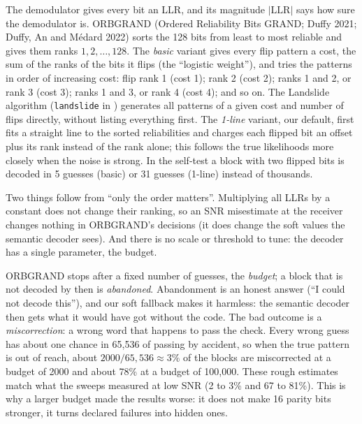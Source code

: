\documentclass{article}
\begin{document}
The demodulator gives every bit an LLR, and its magnitude $|\mathrm{LLR}|$ says how sure the demodulator
is. ORBGRAND (Ordered Reliability Bits GRAND; Duffy 2021; Duffy, An and M\'edard 2022) sorts the 128 bits
from least to most reliable and gives them ranks $1, 2, \dots, 128$. The \emph{basic} variant gives every
flip pattern a cost, the sum of the ranks of the bits it flips (the ``logistic weight''), and tries the
patterns in order of increasing cost: flip rank 1 (cost 1); rank 2 (cost 2); ranks 1 and 2, or rank 3
(cost 3); ranks 1 and 3, or rank 4 (cost 4); and so on. The Landslide algorithm (\texttt{landslide} in
) generates all patterns of a given cost and number of flips directly, without
listing everything first. The \emph{1-line} variant, our default, first fits a straight line to the sorted
reliabilities and charges each flipped bit an offset plus its rank instead of the rank alone; this follows
the true likelihoods more closely when the noise is strong. In the self-test a block with two flipped bits
is decoded in 5 guesses (basic) or 31 guesses (1-line) instead of thousands.

Two things follow from ``only the order matters''. Multiplying all LLRs by a constant does not change
their ranking, so an SNR misestimate at the receiver changes nothing in ORBGRAND's decisions (it does
change the soft values the semantic decoder sees). And there is no scale or threshold to tune: the
decoder has a single parameter, the budget.

\begin{conceptbox}[title={Budget, abandonment, miscorrection}]
ORBGRAND stops after a fixed number of guesses, the \emph{budget}; a block that is not decoded by then is
\emph{abandoned}. Abandonment is an honest answer (``I could not decode this''), and our soft fallback
makes it harmless: the semantic decoder then gets what it would have got without the code. The bad
outcome is a \emph{miscorrection}: a wrong word that happens to pass the check. Every wrong guess has
about one chance in 65{,}536 of passing by accident, so when the true pattern is out of reach, about
$2000/65{,}536 \approx 3\%$ of the blocks are miscorrected at a budget of 2000 and about 78\% at a budget
of 100{,}000. These rough estimates match what the sweeps measured at low SNR (2 to 3\% and 67 to 81\%).
This is why a larger budget made the results worse: it does not make 16 parity bits stronger, it turns
declared failures into hidden ones.
\end{conceptbox}
\end{document}
